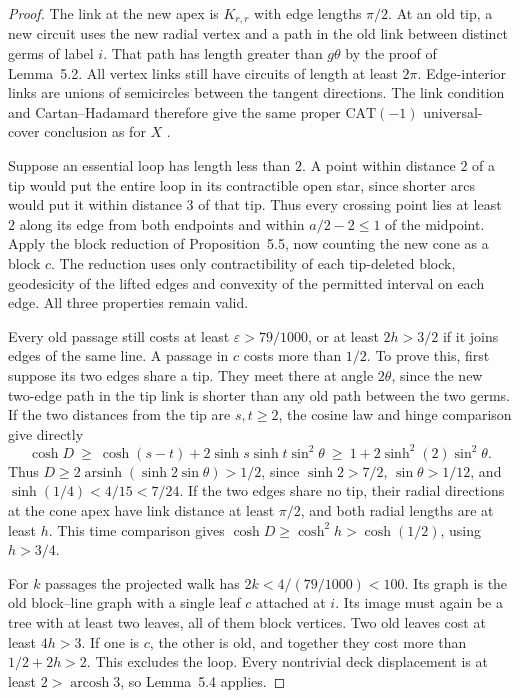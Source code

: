 \documentclass[11pt,a4paper]{article}
\numberwithin{equation}{section}
\begin{document}
\begin{proof}
The link at the new apex is $K_{r,r}$ with edge lengths $\pi/2$. At an old
tip, a new circuit uses the new radial vertex and a path in the old link
between distinct germs of label $i$. That path has length greater than
$g\theta$ by the proof of Lemma~5.2. All vertex links still have circuits of
length at least $2\pi$. Edge-interior links are unions of semicircles between
the tangent directions. The link condition and Cartan--Hadamard therefore
give the same proper $\mathrm{CAT}(-1)$ universal-cover conclusion as for
$X$ \cite[I.7.50, II.5.2, II.5.6 and II.4.1(2)]{r7}.

Suppose an essential loop has length less than $2$. A point within distance
$2$ of a tip would put the entire loop in its contractible open star, since
shorter arcs would put it within distance $3$ of that tip. Thus every
crossing point lies at least $2$ along its edge from both endpoints and
within $a/2-2\leq1$ of the midpoint. Apply the block reduction of
Proposition~5.5, now counting the new cone as a block $c$. The reduction
uses only contractibility of each tip-deleted block, geodesicity of the lifted
edges and convexity of the permitted interval on each edge. All three
properties remain valid.

Every old passage still costs at least $\varepsilon>79/1000$, or at least
$2h>3/2$ if it joins edges of the same line. A passage in $c$ costs more
than $1/2$. To prove this, first suppose its two edges share a tip. They meet
there at angle $2\theta$, since the new two-edge path in the tip link is
shorter than any old path between the two germs. If the two distances from
the tip are $s,t\geq2$, the cosine law and hinge comparison give directly
\begin{equation}
 \cosh D\ \geq\ \cosh(s-t)+2\sinh s\sinh t\sin^2\theta
       \ \geq\ 1+2\sinh^2(2)\sin^2\theta .
 \label{eq:cone-hinge}
\end{equation}
Thus $D\geq2\operatorname{arsinh}(\sinh 2\sin\theta)>1/2$, since
$\sinh 2>7/2$, $\sin\theta>1/12$, and $\sinh(1/4)<4/15<7/24$.
If the two edges share no tip, their radial directions at the cone apex have
link distance at least $\pi/2$, and both radial lengths are at least $h$.
This time comparison gives $\cosh D\geq\cosh^2 h>\cosh(1/2)$, using
$h>3/4$.

For $k$ passages the projected walk has $2k<4/(79/1000)<100$. Its graph is
the old block--line graph with a single leaf $c$ attached at $i$. Its image
must again be a tree with at least two leaves, all of them block vertices.
Two old leaves cost at least $4h>3$. If one is $c$, the other is old, and
together they cost more than $1/2+2h>2$. This excludes the loop. Every
nontrivial deck displacement is at least $2>\operatorname{arcosh}3$, so
Lemma~5.4 applies.
\end{proof}
\end{document}
